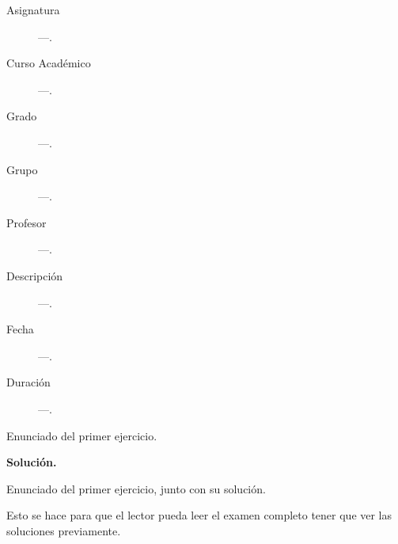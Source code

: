 \documentclass[12pt]{article}
\newcommand{\assetsPath}{.}
\begin{document}

    
    

    \begin{description}
        \item[Asignatura] ---.
        \item[Curso Académico] ---.
        \item[Grado] ---.
        \item[Grupo] ---.
        \item[Profesor] ---.
        \item[Descripción] ---.
        \item[Fecha] ---.
        \item[Duración] ---.
    
    \end{description}
    \newpage


    
    \begin{ejercicio}[X puntos]
        Enunciado del primer ejercicio.
    \end{ejercicio}

    \newpage
    \setcounter{ejercicio}{0} %
    \noindent
    \textbf{Solución.}

    \begin{ejercicio}[X puntos]
        Enunciado del primer ejercicio, junto con su solución.

        Esto se hace para que el lector pueda leer el examen completo tener que ver las soluciones previamente.
    \end{ejercicio}
\end{document}
